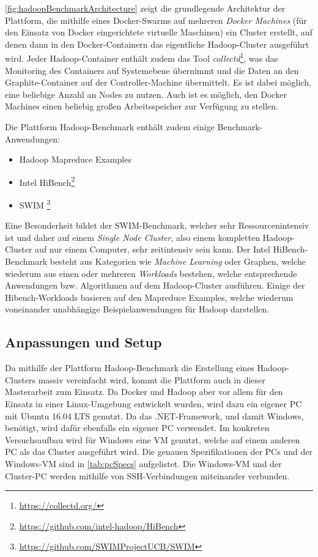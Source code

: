 \autoref{fig:hadoopBenchmarkArchitecture} zeigt die grundlegende Architektur der Plattform, die mithilfe eines Docker-Swarms auf mehreren \emph{Docker Machines} (für den Einsatz von Docker eingerichtete virtuelle Maschinen) ein Cluster erstellt, auf denen dann in den Docker-Containern das eigentliche Hadoop-Cluster ausgeführt wird. Jeder Hadoop-Container enthält zudem das Tool \emph{collectd}\footnote{\url{https://collectd.org/}}, was das Monitoring des Containers auf Systemebene übernimmt und die Daten an den Graphite-Container auf der Controller-Machine übermittelt. Es ist dabei möglich, eine beliebige Anzahl an Nodes zu nutzen. Auch ist es möglich, den Docker Machines einen beliebig großen Arbeitsspeicher zur Verfügung zu stellen.

Die Plattform Hadoop-Benchmark enthält zudem einige Benchmark-Anwendungen:

\begin{itemize}
    \item Hadoop Mapreduce Examples
    \item Intel HiBench\footnote{\url{https://github.com/intel-hadoop/HiBench}}
    \item \ac{SWIM} \footnote{\url{https://github.com/SWIMProjectUCB/SWIM}}
\end{itemize}

Eine Besonderheit bildet der SWIM-Benchmark, welcher sehr Ressourcenintensiv ist und daher auf einem \emph{Single Node Cluster}, also einem kompletten Hadoop-Cluster auf nur einem Computer, sehr zeitintensiv sein kann. Der Intel HiBench-Benchmark besteht aus Kategorien wie \emph{Machine Learning} oder Graphen, welche wiederum aus einen oder mehreren \emph{Workloads} bestehen, welche entsprechende Anwendungen bzw. Algorithmen auf dem Hadoop-Cluster ausführen. Einige der Hibench-Workloads basieren auf den Mapreduce Examples, welche wiederum voneinander unabhängige Beispielanwendungen für Hadoop darstellen.

\subsection{Anpassungen und Setup}\label{sec:clusterFallstudie}

Da mithilfe der Plattform Hadoop-Benchmark die Erstellung eines Hadoop-Clusters massiv vereinfacht wird, kommt die Plattform auch in dieser Masterarbeit zum Einsatz. Da Docker und Hadoop aber vor allem für den Einsatz in einer Linux-Umgebung entwickelt wurden, wird dazu ein eigener PC mit Ubuntu 16.04 LTS genutzt. Da \sS das .NET-Framework, und damit Windows, benötigt, wird dafür ebenfalls ein eigener PC verwendet. Im konkreten Versuchsaufbau wird für Windows eine VM genutzt, welche auf einem anderen PC als das Cluster ausgeführt wird. Die genauen Spezifikationen der PCs und der Windows-VM sind in \autoref{tab:pcSpecs} aufgelistet. Die Windows-VM und der Cluster-PC werden mithilfe von SSH-Verbindungen miteinander verbunden.

